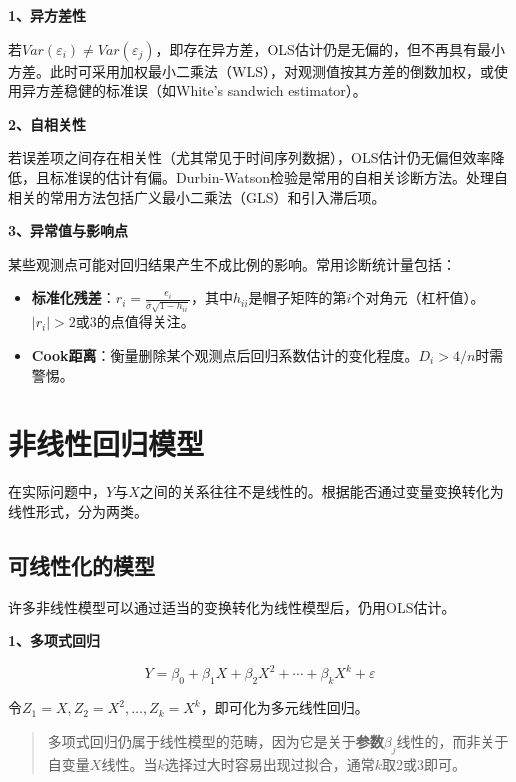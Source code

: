 \documentclass[
]{book}
\providecommand{\tightlist}{%
  \setlength{\itemsep}{0pt}\setlength{\parskip}{0pt}}
\begin{document}
\textbf{1、异方差性}

若\(Var(\varepsilon_i) \neq Var(\varepsilon_j)\)，即存在异方差，OLS估计仍是无偏的，但不再具有最小方差。此时可采用加权最小二乘法（WLS），对观测值按其方差的倒数加权，或使用异方差稳健的标准误（如White's sandwich estimator）。

\textbf{2、自相关性}

若误差项之间存在相关性（尤其常见于时间序列数据），OLS估计仍无偏但效率降低，且标准误的估计有偏。Durbin-Watson检验是常用的自相关诊断方法。处理自相关的常用方法包括广义最小二乘法（GLS）和引入滞后项。

\textbf{3、异常值与影响点}

某些观测点可能对回归结果产生不成比例的影响。常用诊断统计量包括：

\begin{itemize}
\tightlist
\item
  \textbf{标准化残差}：\(r_i = \frac{e_i}{\hat{\sigma}\sqrt{1 - h_{ii}}}\)，其中\(h_{ii}\)是帽子矩阵的第\(i\)个对角元（杠杆值）。\(|r_i| > 2\)或\(3\)的点值得关注。
\item
  \textbf{Cook距离}：衡量删除某个观测点后回归系数估计的变化程度。\(D_i > 4/n\)时需警惕。
\end{itemize}

\section{非线性回归模型}\label{ux975eux7ebfux6027ux56deux5f52ux6a21ux578b}

在实际问题中，\(Y\)与\(X\)之间的关系往往不是线性的。根据能否通过变量变换转化为线性形式，分为两类。

\subsection{可线性化的模型}\label{ux53efux7ebfux6027ux5316ux7684ux6a21ux578b}

许多非线性模型可以通过适当的变换转化为线性模型后，仍用OLS估计。

\textbf{1、多项式回归}

\[
Y = \beta_0 + \beta_1 X + \beta_2 X^2 + \cdots + \beta_k X^k + \varepsilon
\]

令\(Z_1 = X, Z_2 = X^2, \ldots, Z_k = X^k\)，即可化为多元线性回归。

\begin{quote}
多项式回归仍属于线性模型的范畴，因为它是关于\textbf{参数}\(\beta_j\)线性的，而非关于自变量\(X\)线性。当\(k\)选择过大时容易出现过拟合，通常\(k\)取2或3即可。
\end{quote}
\end{document}
